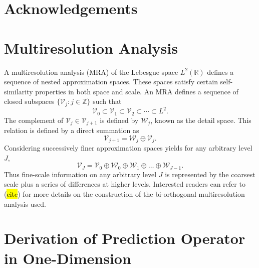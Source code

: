 \documentclass[12pt,letterpaper]{article}
\begin{document}
\section{Acknowledgements}

\appendix

\section{Multiresolution Analysis}

    A multiresolution analysis (MRA) of the Lebesgue space
    $L^{2}(\mathbb{R})$ defines a sequence of nested approximation spaces.
    These spaces satisfy certain self-similarity properties in both space
    and scale. An MRA defines a sequence of closed subspaces $\{ \mathcal{V}_{j} : j \in
    \mathbb{Z} \}$ such that
    \begin{equation*}
        \mathcal{V}_{0} \subset \mathcal{V}_{1} \subset \mathcal{V}_{2} \subset \cdots
        \subset L^{2}.
    \end{equation*}
    The complement of $\mathcal{V}_{j} \in \mathcal{V}_{j+1}$ is defined by
    $\mathcal{W}_{j}$, known as the detail space. This relation is defined
    by a direct summation as
    \begin{equation*}
        \mathcal{V}_{j+1} = \mathcal{W}_{j} \oplus \mathcal{V}_{j}.
    \end{equation*}
    Considering successively finer approximation spaces yields for any
    arbitrary level $J$,
    \begin{equation*}
        \mathcal{V}_{J} = \mathcal{V}_0 \oplus \mathcal{W}_0 \oplus \mathcal{W}_1 \oplus \dots \oplus \mathcal{W}_{J-1}.
    \end{equation*}
    Thus fine-scale information on any arbitrary level $J$ is represented by
    the coarsest scale plus a series of differences at higher levels.
    Interested readers can refer to (\hl{cite}) for more details on the
    construction of the bi-orthogonal multiresolution analysis used.


\section{Derivation of Prediction Operator in One-Dimension}
\end{document}
